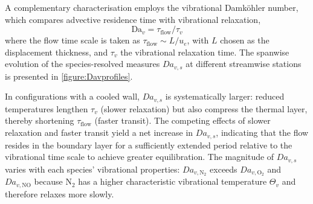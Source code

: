 

A complementary characterisation employs the vibrational Damköhler number, which compares advective residence time with vibrational relaxation,
\begin{equation}
    \mathrm{Da}_v = \tau_{\mathrm{flow}}/\tau_v
\end{equation}
where the flow time scale is taken as \(\tau_{\mathrm{flow}} \sim L/u_e\), with \(L\) chosen as the displacement thickness, and \(\tau_v\) the vibrational relaxation time. The spanwise evolution of the species-resolved measures \(Da_{v,s}\) at different streamwise stations is presented in \cref{figure:Davprofiles}.

In configurations with a cooled wall, \(Da_{v,s}\) is systematically larger: reduced temperatures lengthen \(\tau_v\) (slower relaxation) but also compress the thermal layer, thereby shortening \(\tau_{\mathrm{flow}}\) (faster transit). The competing effects of slower relaxation and faster transit yield a net increase in \(Da_{v,s}\), indicating that the flow resides in the boundary layer for a sufficiently extended period relative to the vibrational time scale to achieve greater equilibration. The magnitude of \(Da_{v,s}\) varies with each species' vibrational properties: \(Da_{v,\mathrm{N_2}}\) exceeds \(Da_{v,\mathrm{O_2}}\) and \(Da_{v,\mathrm{NO}}\) because \(\mathrm{N_2}\) has a higher characteristic vibrational temperature \(\Theta_v\) and therefore relaxes more slowly.

